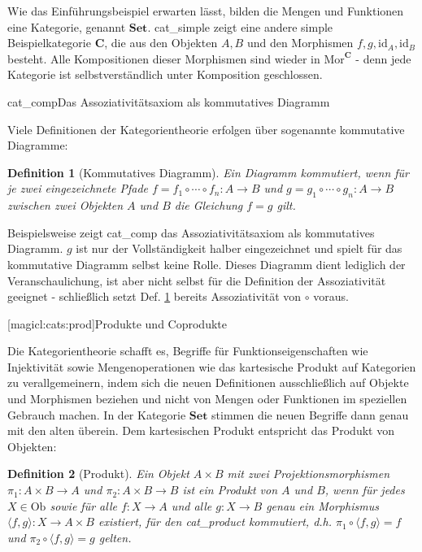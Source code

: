 \documentclass[a4paper, bibgerm]{book}
\newcommand\lsubsection{}
\newcommand\abb{}
\newcommand\fig{}
\newcommand\ato{\rightarrow} %
\newtheorem{defini}{Definition}
\newcommand{\defi}[2]{%
  \begin{defini}[#1]
    \label{def:#1}
    #2
  \end{defini}
}
\newcommand{\dref}[1]{Def. \ref{def:#1}}
\begin{document}
Wie das Einführungsbeispiel erwarten lässt, bilden die Mengen und
Funktionen eine Kategorie, genannt $\mathbf{Set}$. \abb{cat_simple} zeigt eine
andere simple Beispielkategorie $\mathbf{C}$, die aus den Objekten $A, B$ und den
Morphismen $f, g, \mathrm{id}_A, \mathrm{id}_B$ besteht. Alle Kompositionen
dieser Morphismen sind wieder in $\mathrm{Mor}^{\mathbf{C}}$ - denn
jede Kategorie ist selbstverständlich unter Komposition geschlossen.

\fig{cat_comp}{Das Assoziativitätsaxiom als kommutatives Diagramm}

Viele Definitionen der Kategorientheorie erfolgen über sogenannte
kommutative Diagramme:

\defi{Kommutatives Diagramm}{ Ein Diagramm kommutiert, wenn
  für je zwei eingezeichnete Pfade $f=f_1 \circ \cdots \circ f_n : A
  \rightarrow B$ und $g=g_1 \circ \cdots \circ g_n : A \rightarrow B$
  zwischen zwei Objekten $A$ und $B$ die Gleichung $f=g$ gilt.  }
Beispielsweise zeigt \abb{cat_comp} das Assoziativitätsaxiom als
kommutatives Diagramm. $g$ ist nur der Vollständigkeit halber
eingezeichnet und spielt für das kommutative Diagramm selbst keine
Rolle. Dieses Diagramm dient lediglich der Veranschaulichung, ist aber
nicht selbst für die Definition der Assoziativität geeignet -
schließlich setzt \dref{Kommutatives Diagramm} bereits Assoziativität
von $\circ$ voraus.

\lsubsection[magicl:cats:prod]{Produkte und Coprodukte}

Die Kategorientheorie schafft es, Begriffe für Funktionseigenschaften
wie Injektivität sowie Mengenoperationen wie das kartesische Produkt auf
Kategorien zu verallgemeinern, indem sich die neuen Definitionen
ausschließlich auf Objekte und Morphismen beziehen und nicht von Mengen
oder Funktionen im speziellen Gebrauch machen. In der Kategorie
$\mathbf{Set}$ stimmen die neuen Begriffe dann genau mit den alten
überein. Dem kartesischen Produkt entspricht das Produkt von Objekten:

\defi{Produkt}{ Ein Objekt $A \times B$ mit zwei Projektionsmorphismen
  $\pi_1 : A \times B \ato A$ und $\pi_2 : A \times B \ato B$ ist ein
  Produkt von $A$ und $B$, wenn für jedes $X \in \mathrm{Ob}$ sowie für
  alle $f : X \ato A$ und alle $g : X \ato B$ genau ein Morphismus
  $\langle f,g \rangle : X \ato A \times B$ existiert, für den
  \abb{cat_product} kommutiert, d.h.  $\pi_1 \circ \langle f,g \rangle =
  f$ und $\pi_2 \circ \langle f,g \rangle = g$ gelten.  }
\end{document}
